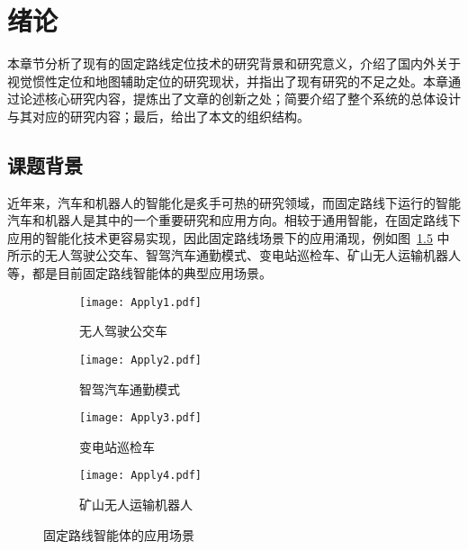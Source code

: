 
\chapter{绪论}

本章节分析了现有的固定路线定位技术的研究背景和研究意义，介绍了国内外关于视觉惯性定位和地图辅助定位的研究现状，并指出了现有研究的不足之处。本章通过论述核心研究内容，提炼出了文章的创新之处；简要介绍了整个系统的总体设计与其对应的研究内容；最后，给出了本文的组织结构。


\section{课题背景}

近年来，汽车和机器人的智能化是炙手可热的研究领域，而固定路线下运行的智能汽车和机器人是其中的一个重要研究和应用方向。相较于通用智能，在固定路线下应用的智能化技术更容易实现，因此固定路线场景下的应用涌现，例如图~\ref{fig:apply} 中所示的无人驾驶公交车\cite{stephen2023driverless}、智驾汽车通勤模式\cite{xin2023xinchuxing}、变电站巡检车\cite{song2020xinhuawang}、矿山无人运输机器人\cite{li2023keji}等，都是目前固定路线智能体的典型应用场景。

\begin{figure}[htbp]
  \centering
  \begin{subfigure}[b]{0.45\textwidth}
      \centering
      \texttt{[image: Apply1.pdf]}
      \caption{无人驾驶公交车\cite{stephen2023driverless}}
      \label{fig:apply_sub1}
  \end{subfigure}
  \begin{subfigure}[b]{0.45\textwidth}
      \centering
      \texttt{[image: Apply2.pdf]}
      \caption{智驾汽车通勤模式\cite{xin2023xinchuxing}}
      \label{fig:apply_sub2}
  \end{subfigure}
  \begin{subfigure}[b]{0.45\textwidth}
      \centering
      \texttt{[image: Apply3.pdf]}
      \caption{变电站巡检车\cite{song2020xinhuawang}}
      \label{fig:apply_sub3}
  \end{subfigure}
  \begin{subfigure}[b]{0.45\textwidth}
      \centering
      \texttt{[image: Apply4.pdf]}
      \caption{矿山无人运输机器人\cite{li2023keji}}
      \label{fig:apply_sub4}
  \end{subfigure}

  \caption{固定路线智能体的应用场景}
  \label{fig:apply}
\end{figure}

